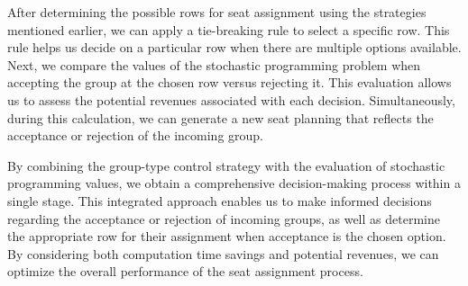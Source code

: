 After determining the possible rows for seat assignment using the strategies mentioned earlier, we can apply a tie-breaking rule to select a specific row. This rule helps us decide on a particular row when there are multiple options available. Next, we compare the values of the stochastic programming problem when accepting the group at the chosen row versus rejecting it. This evaluation allows us to assess the potential revenues associated with each decision. Simultaneously, during this calculation, we can generate a new seat planning that reflects the acceptance or rejection of the incoming group.


By combining the group-type control strategy with the evaluation of stochastic programming values, we obtain a comprehensive decision-making process within a single stage. This integrated approach enables us to make informed decisions regarding the acceptance or rejection of incoming groups, as well as determine the appropriate row for their assignment when acceptance is the chosen option. By considering both computation time savings and potential revenues, we can optimize the overall performance of the seat assignment process.








